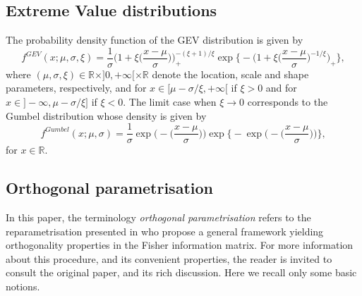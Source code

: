 \documentclass{article}
\newcommand{\mb}{\mathbb}
\newcommand{\1}{\mathds{1}}
\theoremstyle{definition}
\begin{document}
\subsection{Extreme Value distributions}

The probability density function of the GEV distribution is given by
\begin{equation}\label{eq:gev_dens}
    f^{GEV}(x;\mu,\sigma,\xi) = \frac{1}{\sigma}\Big(1+\xi\Big(\frac{x-\mu}{\sigma}\Big)\Big)_+^{-(\xi+1)/\xi}\exp\Big\{-\Big(1+\xi\Big(\frac{x-\mu}{\sigma}\Big)^{-1/\xi}\Big)_+\Big\},
\end{equation}
where $(\mu,\sigma,\xi) \in \mb{R}\times ]0,+\infty[\times \mb{R}$ denote the location, scale and shape parameters, respectively, and for $x \in [\mu - \sigma/\xi,+\infty[$ if $\xi >0$ and for $x \in ]-\infty,\mu - \sigma/\xi]$ if $\xi <0$. The limit case when $\xi \rightarrow 0$ corresponds to the Gumbel distribution whose density is given by
\begin{equation*}
    f^{Gumbel}(x;\mu,\sigma) = \frac{1}{\sigma}\exp\Big(-\Big(\frac{x-\mu}{\sigma}\Big)\Big)\exp\Big\{-\exp\Big(-\Big(\frac{x-\mu}{\sigma}\Big)\Big)\Big\},
\end{equation*}
for $x \in \mb{R}$.



\subsection{Orthogonal parametrisation}\label{sec:ortho_param}
In this paper, the terminology \textit{orthogonal parametrisation} refers to the reparametrisation presented in \cite{cox1987parameter} who propose a general framework yielding orthogonality properties in the Fisher information matrix. For more information about this procedure, and its convenient properties, the reader is invited to consult the original paper, and its rich discussion. Here we recall only some basic notions. 
\end{document}
